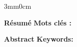 

\thispagestyle{backcover}

\begin{changemargin}{3mm}{0cm}
    \begin{minipage}[c]{0.96\columnwidth}
        
        
        
        
        {\LARGE\textbf{Résumé}}
        \vskip1mm
            \begingroup
                \normalsize
                \@frenchAbstract
            \endgroup
        \vskip2mm
        {\normalsize\textbf{Mots clés :}~%
            \begingroup%
                \@frenchAbstractKeywords%
            \endgroup%
        }

        \vskip6mm

        {\LARGE\textbf{Abstract}}
        \vskip1mm
            \begingroup
                \normalsize
                \@englishAbstract
            \endgroup
        \vskip2mm
        {\normalsize\textbf{Keywords:}~%
            \begingroup%
                \@englishAbstractKeywords%
            \endgroup%
        }


    \end{minipage}
    
\end{changemargin}